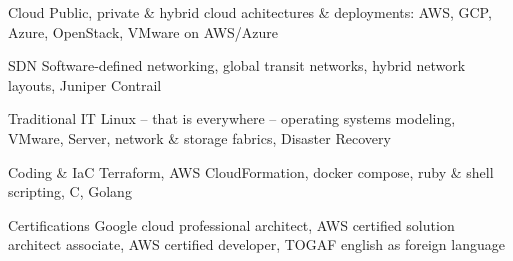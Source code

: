 
\begin{cvskills}

  \cvskill
    {Cloud} %
	{Public, private \& hybrid cloud achitectures \& deployments: \newline AWS, GCP, Azure, OpenStack, VMware on AWS/Azure}

  \cvskill
    {SDN} %
    {Software-defined networking, global transit networks, \newline hybrid network layouts, Juniper Contrail}

  \cvskill
    {Traditional IT} %
	{Linux -- that is everywhere -- operating systems modeling, VMware, \newline Server, network \& storage fabrics, Disaster Recovery}

  \cvskill
	{Coding \& IaC} %
    {Terraform, AWS CloudFormation, docker compose, ruby \& shell scripting, C, Golang}

  \cvskill
    {Certifications} %
    {Google cloud professional architect, AWS certified solution architect associate, \newline AWS certified developer, TOGAF english as foreign language}

\end{cvskills}
